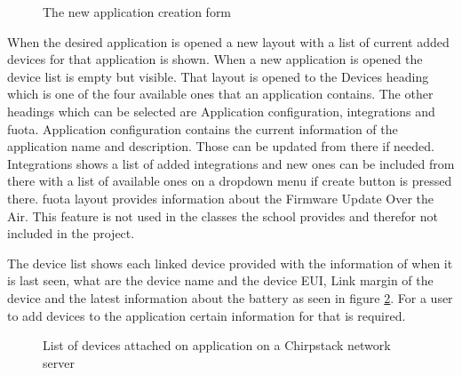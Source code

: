 \begin{figure}[ht]
  \centering
  \caption{The new application creation form}
  \label{fig:chirpstack_new_application}
\end{figure}

When the desired application is opened a new layout with a list of current added devices for that application is shown.
When a new application is opened the device list is empty but visible.
That layout is opened to the Devices heading which is one of the four available ones that an application contains.
The other headings which can be selected are Application configuration, integrations and \gls{fuota}.
Application configuration contains the current information of the application name and description.
Those can be updated from there if needed.
Integrations shows a list of added integrations and new ones can be included from there with a list of available ones on a dropdown menu if create button is pressed there.
\gls{fuota} layout provides information about the Firmware Update Over the Air.
This feature is not used in the classes the school provides and therefor not included in the project. 

The device list shows each linked device provided with the information of when it is last seen, what are the device name and the device EUI, Link margin of the device and the latest information about the battery as seen in figure \ref{fig:chirpstack_application}.
For a user to add devices to the application certain information for that is required.

\begin{figure}[ht]
  \centering
  \caption{List of devices attached on application on a Chirpstack network server}
  \label{fig:chirpstack_application}
\end{figure}

